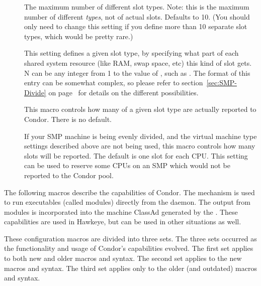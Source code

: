 \begin{description}

\item[]
\label{param:MaxSlotTypes}
  The maximum number of different slot types.  
  Note: this is the maximum number of different \emph{types}, not of
  actual slots.
  Defaults to 10.  
  (You should only need to change this setting if you define more than
  10 separate slot types, which would be pretty rare.)

\item[]
\label{param:SlotTypeN}
  This setting defines a given slot type, by specifying
  what part of each shared system resource (like RAM, swap space, etc)
  this kind of slot gets.
  N can be any integer from 1 to the value of
  , such as
  . 
  The format of this entry can be somewhat complex, so please refer to
  section~\ref{sec:SMP-Divide} on page~\pageref{sec:SMP-Divide} for
  details on the different possibilities.

\item[]
\label{param:NumSlotsTypeN}
  This macro controls how many of a given slot type
  are actually reported to Condor.
  There is no default.

\item[]
\label{param:NumSlots}
  If your SMP machine is being evenly divided, and the virtual
  machine type settings described above are not being used, this
  macro controls how many slots will be reported.  
  The default is one slot for each CPU.
  This setting can be used to reserve some CPUs on an SMP which would
  not be reported to the Condor pool.

\end{description}

The following macros describe the  capabilities of Condor.
The  mechanism is used to run executables (called
modules) directly from the  daemon.
The output from modules
is incorporated into the machine ClassAd generated by the
.  These capabilities are used in Hawkeye, but can be
used in other situations as well.

These configuration macros are divided into three sets.
The three sets occurred as the functionality and usage of
Condor's  capabilities evolved.
The first set applies to both new and older macros and syntax.
The second set applies to the new macros and syntax.
The third set applies only to the older (and outdated) macros and syntax.


